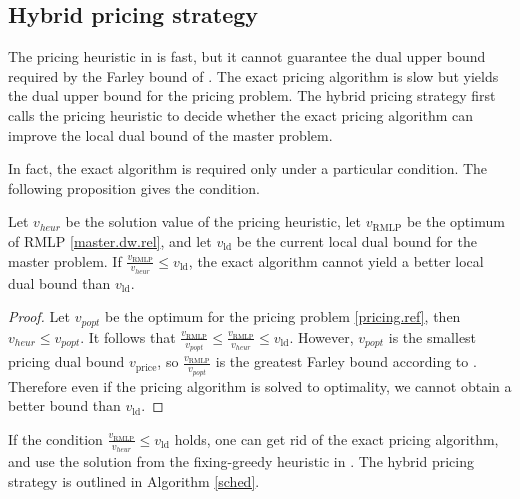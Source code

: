  

 


\subsection{Hybrid pricing strategy}
The pricing heuristic in  is fast, but it cannot guarantee the dual upper bound required by the Farley bound of . The exact pricing algorithm is slow but yields the dual upper bound for the pricing problem. The hybrid pricing strategy first calls the pricing heuristic  to decide whether the exact pricing algorithm can improve the local dual bound of the master problem.

In fact, the exact algorithm is required only under a particular condition. The following proposition gives the condition.
 
\begin{proposition}
\label{lem.bdimprove}
Let \(v_{heur}\) be the solution value of the pricing heuristic, let \(v_{\mathrm{RMLP}}\) be the optimum of RMLP \eqref{master.dw.rel}, and let \(v_{\mathrm{ld}}\) be the current local dual bound for the master problem. If \(\frac{v_{\mathrm{RMLP}}}{v_{heur}} \le v_{\mathrm{ld}}\), the exact algorithm cannot yield a better local dual bound than $v_{\mathrm{ld}}$.
\end{proposition}
\begin{proof}
Let \(v_{popt}\) be the optimum for the pricing problem \eqref{pricing.ref}, then \(v_{heur} \le v_{popt}\). It follows that \(\frac{v_{\mathrm{RMLP}}}{v_{popt}}\le \frac{v_{\mathrm{RMLP}}}{v_{heur}} \le  v_{\mathrm{ld}}\). However, $v_{popt}$ is the smallest pricing dual bound $v_{\mathrm{price}}$, so $\frac{v_{\mathrm{RMLP}}}{v_{popt}}$ is the greatest Farley bound according to . Therefore even if the pricing algorithm is solved to optimality, we cannot obtain a better bound than \(v_{\mathrm{ld}}\).
 \end{proof}

 If the condition \(\frac{v_{\mathrm{RMLP}}}{v_{heur}} \le v_{\mathrm{ld}}\) holds, one can get rid of the exact pricing algorithm, and use the solution from the fixing-greedy heuristic in . The hybrid pricing strategy is outlined in Algorithm \ref{sched}.


